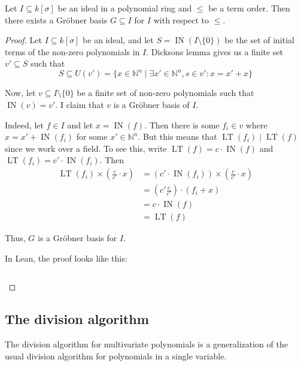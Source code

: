 \documentclass[a4paper, 12pt]{article}
\newcommand{\N}{\mathbb{N}}
\DeclareMathOperator{\IN}{IN}
\DeclareMathOperator{\LT}{LT}
\theoremstyle{changedot}
\theoremstyle{changedotbreak}
\theoremstyle{nonumberplain}
\newtheorem{proof}{Proof}
\begin{document}
\begin{theorem}
  Let $I \subseteq k[\sigma]$ be an ideal in a polynomial ring and $\le$ be a term order. Then there exists a Gröbner basis $G \subseteq I$ for $I$ with respect to $\le$.
\end{theorem}
\begin{proof}
  Let $I \subseteq k[\sigma]$ be an ideal, and let $S = \IN(I \setminus \{0\})$ be the set of initial terms of the non-zero polynomials in $I$. Dicksons lemma gives us a finite set $v' \subseteq S$ such that
  \[S \subseteq U(v') = \{x \in \N^{n} \mid \exists x' \in \N^{n}, s \in v' : x = x' + x\}\]

  Now, let $v \subseteq I\setminus \{0\}$ be a finite set of non-zero polynomials such that $\IN(v) = v'$. I claim that $v$ is a Gröbner basis of $I$.

  Indeed, let $f \in I$ and let $x = \IN(f)$. Then there is some $f_{i} \in v$ where $x = x' + \IN(f_{i})$ for some $x' \in \N^{n}$. But this means that $\LT(f_{i}) \mid \LT(f)$ since we work over a field. To see this, write $\LT(f) = c \cdot \IN(f)$ and $\LT(f_{i}) = c' \cdot \IN(f_{i})$. Then
  \begin{align*}
    \LT(f_{i}) \times \left(\frac{c}{c'} \cdot x\right) &= (c' \cdot \IN(f_{i})) \times \left(\frac{c}{c'} \cdot x\right) \\
                                   &= \left(c' \frac{c}{c'}\right) \cdot (f_{i} + x) \\
                                                    &= c \cdot \IN(f) \\
    &= \LT(f)
  \end{align*}

  Thus, $G$ is a Gröbner basis for $I$.

  In Lean, the proof looks like this:

  \inputminted[firstline=25, lastline=62]{lean}{../src/groebner_basis.lean}
\end{proof}

\subsection{The division algorithm}
The division algorithm for multivariate polynomials is a generalization of the usual division algorithm for polynomials in a single variable.
\end{document}
